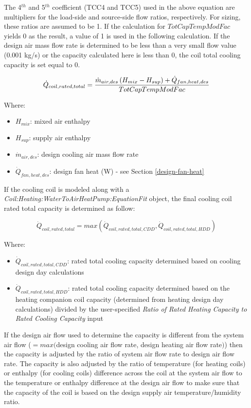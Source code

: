 The 4\(^{th}\) and 5\(^{th}\) coefficient (TCC4 and TCC5) used in the above equation are multipliers for the load-side and source-side flow ratios, respectively. For sizing, these ratios are assumed to be 1. If the calculation for $TotCapTempModFac$ yields 0 as the result, a value of 1 is used in the following calculation. If the design air mass flow rate is determined to be less than a very small flow value (0.001 kg/s) or the capacity calculated here is less than 0, the coil total cooling capacity is set equal to 0.

\begin{equation}
  \dot{Q}_{coil,rated,total}   = \frac{\dot{m}_{air,des}\left(H_{mix}-H_{sup}\right)+ \dot{Q}_{fan,heat,des}}{TotCapTempModFac}
\end{equation}

Where:

\begin{itemize}
\item \(H_{mix}\): mixed air enthalpy
\item \(H_{sup}\): supply air enthalpy
\item \(\dot{m}_{air,des}\): design cooling air mass flow rate
\item \(\dot{Q}_{fan,heat,des}\): design fan heat (W) - see Section \ref{design-fan-heat}
\end{itemize}

If the cooling coil is modeled along with a \emph{Coil:Heating:WaterToAirHeatPump:EquationFit} object, the final cooling coil rated total capacity is determined as follow:

\begin{equation}
  \dot{Q}_{coil,rated,total} = max(\dot{Q}_{coil,rated,total,CDD}, \dot{Q}_{coil,rated,total,HDD})
\end{equation}

Where:

\begin{itemize}
\item \(\dot{Q}_{coil,rated,total,CDD}\): rated total cooling capacity determined based on cooling design day calculations
\item \(\dot{Q}_{coil,rated,total,HDD}\): rated total cooling capacity determined based on the heating companion coil capacity (determined from heating design day calculations) divided by the user-specified \emph{Ratio of Rated Heating Capacity to Rated Cooling Capacity} input
\end{itemize}

If the design air flow used to determine the capacity is different from the system air flow ($= max($design cooling air flow rate, design heating air flow rate$)$) then the capacity is adjusted by the ratio of system air flow rate to design air flow rate. The capacity is also adjusted by the ratio of temperature (for heating coils) or enthalpy (for cooling coils) difference across the coil at the system air flow to the temperature or enthalpy difference at the design air flow to make sure that the capacity of the coil is based on the design supply air temperature/humidity ratio.

